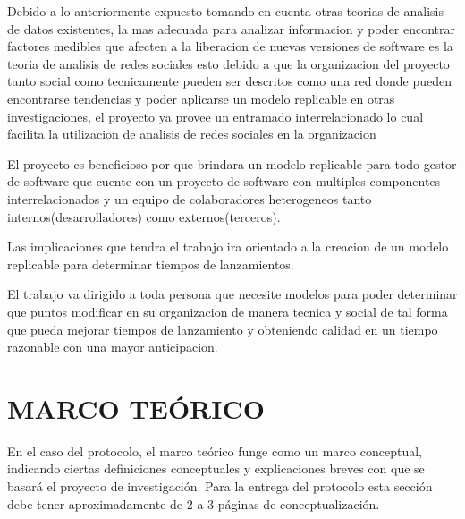 \documentclass[12pt]{report}
\begin{document}
Debido a lo anteriormente expuesto tomando en cuenta otras teorias de
analisis de datos existentes, la mas adecuada para analizar
informacion y poder encontrar factores medibles que afecten a la
liberacion de nuevas versiones de software es la teoria de analisis de
redes sociales esto debido a que la organizacion del proyecto tanto
social como tecnicamente pueden ser descritos como una red donde
pueden encontrarse tendencias y poder aplicarse un modelo replicable
en otras investigaciones, el proyecto ya provee un entramado
interrelacionado lo cual facilita la utilizacion de analisis de redes
sociales en la organizacion

El proyecto es beneficioso por que brindara un modelo replicable para
todo gestor de software que cuente con un proyecto de software con
multiples componentes interrelacionados y un equipo de colaboradores
heterogeneos tanto internos(desarrolladores) como externos(terceros).

Las implicaciones que tendra el trabajo ira orientado a la creacion de
un modelo replicable para determinar tiempos de lanzamientos.

El trabajo va dirigido a toda persona que necesite modelos para poder
determinar que puntos modificar en su organizacion de manera tecnica y
social de tal forma que pueda mejorar tiempos de lanzamiento y
obteniendo calidad en un tiempo razonable con una mayor anticipacion.

\chapter*{MARCO TEÓRICO}

En el caso del protocolo, el marco teórico funge como un marco
conceptual, indicando ciertas definiciones conceptuales y
explicaciones breves con que se basará el proyecto de
investigación. Para la entrega del protocolo esta sección debe tener
aproximadamente de 2 a 3 páginas de conceptualización.
\end{document}
